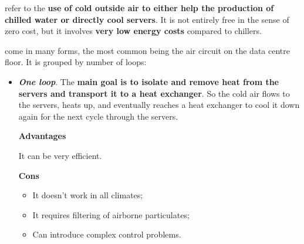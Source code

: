 \highspace
{} refer to the \textbf{use of cold outside air to either help the production of chilled water or directly cool servers}. It is not entirely free in the sense of zero cost, but it involves \textbf{very low energy costs} compared to chillers.

\highspace
{} come in many forms, the most common being the air circuit on the data centre floor. 
It is grouped by number of loops:
\begin{itemize}
	\item \textbf{\emph{One loop}}. The \textbf{main goal is to isolate and remove heat from the servers and transport it to a heat exchanger}. So the cold air flows to the servers, heats up, and eventually reaches a heat exchanger to cool it down again for the next cycle through the servers.
	\begin{flushleft}
		\textcolor{Green3}{ \textbf{Advantages}}
	\end{flushleft}
	It can be very efficient.
	\begin{flushleft}
		\textcolor{Red2}{ \textbf{Cons}}
	\end{flushleft}
	\begin{itemize}
		\item It doesn't work in all climates;
		\item It requires filtering of airborne particulates;
		\item Can introduce complex control problems.
	\end{itemize}
	

\end{itemize}
